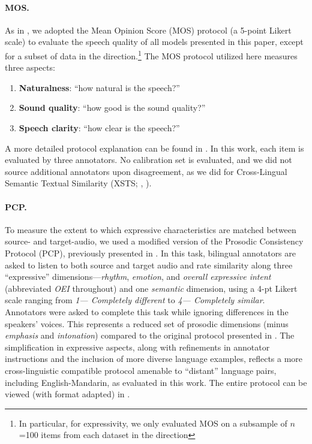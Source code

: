 \paragraph{MOS.}
\label{sec:mos} 
As in \citet{SeamlessM4TArXiv}, we adopted the Mean Opinion Score (MOS) protocol (a 5-point Likert scale) \cite{p808} to evaluate the speech quality of all models presented in this paper, except for a subset of data in the \xeng direction.\footnote{In particular, for expressivity, we only evaluated MOS on a subsample of $n$=100 items from each dataset in the \xeng direction} The MOS protocol utilized here measures three aspects:

\begin{enumerate}
\item \textbf{Naturalness}: ``how natural is the speech?''
\item \textbf{Sound quality}: ``how good is the sound quality?''
\item \textbf{Speech clarity}: ``how clear is the speech?''
\end{enumerate}

A more detailed protocol explanation can be found in \citet{SeamlessM4TArXiv}. In this work, each item is evaluated by three annotators. No calibration set is evaluated, and we did not source additional annotators upon disagreement, as we did for Cross-Lingual Semantic Textual Similarity (XSTS; \citep{licht2022xsts}, \citep{SeamlessM4TArXiv}).



\paragraph{PCP.}
\label{sec:pcp}
To measure the extent to which expressive characteristics are matched between source- and target-audio, we used a modified version of the Prosodic Consistency Protocol (PCP), previously presented in \cite{huang2023holistic}. In this task, bilingual annotators are asked to listen to both source and target audio and rate similarity along three “expressive” dimensions—\textit{rhythm}, \textit{emotion}, and \textit{overall expressive intent} (abbreviated \textit{OEI} throughout) and one \textit{semantic} dimension, using a 4-pt Likert scale ranging from \textit{1— Completely different} to \textit{4— Completely similar}. Annotators were asked to complete this task while ignoring differences in the speakers' voices. This represents a reduced set of prosodic dimensions (minus \textit{emphasis} and \textit{intonation}) compared to the original protocol presented in \citet{huang2023holistic}. The simplification in expressive aspects, along with refinements in annotator instructions and the inclusion of more diverse language examples, reflects a more cross-linguistic compatible protocol amenable to “distant” language pairs, including English-Mandarin, as evaluated in this work. The entire protocol can be viewed (with format adapted) in .

